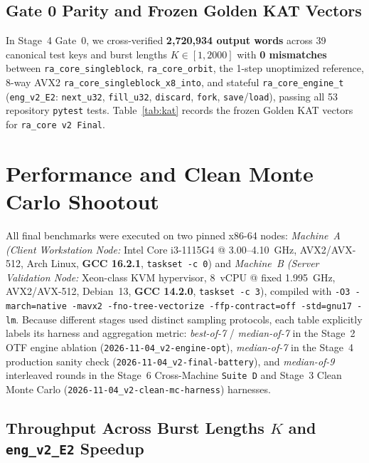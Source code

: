 \documentclass[conference]{IEEEtran}
\begin{document}
\subsection{Gate 0 Parity and Frozen Golden KAT Vectors}

In Stage~4 Gate~0, we cross-verified \textbf{2,720,934 output words} across 39 canonical test keys and burst lengths $K \in [1, 2000]$ with \textbf{0 mismatches} between \texttt{ra\_core\_singleblock}, \texttt{ra\_core\_orbit}, the 1-step unoptimized reference, 8-way AVX2 \texttt{ra\_core\_singleblock\_x8\_into}, and stateful \texttt{ra\_core\_engine\_t} (\texttt{eng\_v2\_E2}: \texttt{next\_u32}, \texttt{fill\_u32}, \texttt{discard}, \texttt{fork}, \texttt{save}/\texttt{load}), passing all 53 repository \texttt{pytest} tests. Table~\ref{tab:kat} records the frozen Golden KAT vectors for \texttt{ra\_core v2 Final}.

\section{Performance and Clean Monte Carlo Shootout}\label{sec:mc}

All final benchmarks were executed on two pinned x86-64 nodes: \emph{Machine~A (Client Workstation Node:} Intel Core i3-1115G4 @ 3.00--4.10~GHz, AVX2/AVX-512, Arch Linux, \textbf{GCC 16.2.1}, \texttt{taskset -c 0}) and \emph{Machine~B (Server Validation Node:} Xeon-class KVM hypervisor, 8~vCPU @ fixed 1.995~GHz, AVX2/AVX-512, Debian~13, \textbf{GCC 14.2.0}, \texttt{taskset -c 3}), compiled with \texttt{-O3 -march=native -mavx2 -fno-tree-vectorize -ffp-contract=off -std=gnu17 -lm}. Because different stages used distinct sampling protocols, each table explicitly labels its harness and aggregation metric: \emph{best-of-7} / \emph{median-of-7} in the Stage~2 OTF engine ablation (\texttt{2026-11-04\_v2-engine-opt}), \emph{median-of-7} in the Stage~4 production sanity check (\texttt{2026-11-04\_v2-final-battery}), and \emph{median-of-9} interleaved rounds in the Stage~6 Cross-Machine \texttt{Suite~D} and Stage~3 Clean Monte Carlo (\texttt{2026-11-04\_v2-clean-mc-harness}) harnesses.

\subsection{Throughput Across Burst Lengths $K$ and \texttt{eng\_v2\_E2} Speedup}
\end{document}

